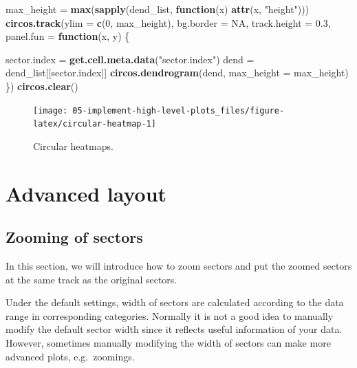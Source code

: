 \documentclass[]{book}
\newenvironment{Shaded}{\begin{snugshade}}{\end{snugshade}}
\newcommand{\KeywordTok}[1]{\textcolor[rgb]{0.13,0.29,0.53}{\textbf{#1}}}
\newcommand{\DataTypeTok}[1]{\textcolor[rgb]{0.13,0.29,0.53}{#1}}
\newcommand{\DecValTok}[1]{\textcolor[rgb]{0.00,0.00,0.81}{#1}}
\newcommand{\FloatTok}[1]{\textcolor[rgb]{0.00,0.00,0.81}{#1}}
\newcommand{\StringTok}[1]{\textcolor[rgb]{0.31,0.60,0.02}{#1}}
\newcommand{\OtherTok}[1]{\textcolor[rgb]{0.56,0.35,0.01}{#1}}
\newcommand{\ControlFlowTok}[1]{\textcolor[rgb]{0.13,0.29,0.53}{\textbf{#1}}}
\newcommand{\NormalTok}[1]{#1}
\theoremstyle{definition}
\theoremstyle{definition}
\theoremstyle{remark}
\begin{document}
\begin{Shaded}
\begin{Highlighting}[]
\NormalTok{max_height =}\StringTok{ }\KeywordTok{max}\NormalTok{(}\KeywordTok{sapply}\NormalTok{(dend_list, }\ControlFlowTok{function}\NormalTok{(x) }\KeywordTok{attr}\NormalTok{(x, }\StringTok{"height"}\NormalTok{)))}
\KeywordTok{circos.track}\NormalTok{(}\DataTypeTok{ylim =} \KeywordTok{c}\NormalTok{(}\DecValTok{0}\NormalTok{, max_height), }\DataTypeTok{bg.border =} \OtherTok{NA}\NormalTok{, }\DataTypeTok{track.height =} \FloatTok{0.3}\NormalTok{, }
    \DataTypeTok{panel.fun =} \ControlFlowTok{function}\NormalTok{(x, y) \{}

\NormalTok{        sector.index =}\StringTok{ }\KeywordTok{get.cell.meta.data}\NormalTok{(}\StringTok{"sector.index"}\NormalTok{)}
\NormalTok{        dend =}\StringTok{ }\NormalTok{dend_list[[sector.index]]}
        \KeywordTok{circos.dendrogram}\NormalTok{(dend, }\DataTypeTok{max_height =}\NormalTok{ max_height)}
\NormalTok{\})}
\KeywordTok{circos.clear}\NormalTok{()}
\end{Highlighting}
\end{Shaded}

\begin{figure}

{\centering \texttt{[image: 05-implement-high-level-plots\_files/figure-latex/circular-heatmap-1]} 

}

\caption{Circular heatmaps.}\label{fig:circular-heatmap}
\end{figure}

\chapter{Advanced layout}\label{advanced-layout}

\section{Zooming of sectors}\label{zooming-of-sectors}

In this section, we will introduce how to zoom sectors and put the
zoomed sectors at the same track as the original sectors.

Under the default settings, width of sectors are calculated according to
the data range in corresponding categories. Normally it is not a good
idea to manually modify the default sector width since it reflects
useful information of your data. However, sometimes manually modifying
the width of sectors can make more advanced plots, e.g.~zoomings.
\end{document}
